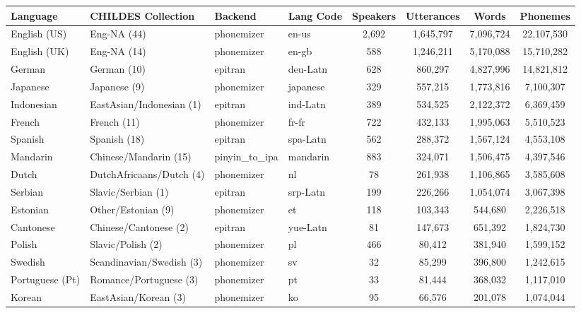 \begin{table}[t]
    \centering
    \scriptsize
    \begin{tabular}{llllcccc}
        \toprule
        \textbf{Language} & \textbf{CHILDES Collection} & \textbf{Backend} & \textbf{Lang Code} & \textbf{Speakers} & \textbf{Utterances} & \textbf{Words} & \textbf{Phonemes} \\
        \midrule
        English (US)  & Eng-NA (44) & phonemizer & en-us & 2,692  & 1,645,797  & 7,096,724  & 22,107,530 \\
        English (UK)  & Eng-NA (14) & phonemizer & en-gb & 588  & 1,246,211  & 5,170,088  & 15,710,282 \\
        German  & German (10) & epitran & deu-Latn & 628  & 860,297  & 4,827,996  & 14,821,812 \\
        Japanese  & Japanese (9) & phonemizer & japanese & 329  & 557,215  & 1,773,816  & 7,100,307 \\
        Indonesian  & EastAsian/Indonesian (1) & epitran & ind-Latn & 389  & 534,525  & 2,122,372  & 6,369,459 \\
        French  & French (11) & phonemizer & fr-fr & 722  & 432,133  & 1,995,063  & 5,510,523 \\
        Spanish  & Spanish (18) & epitran & spa-Latn & 562  & 288,372  & 1,567,124  & 4,553,108 \\
        Mandarin  & Chinese/Mandarin (15) & pinyin\_to\_ipa & mandarin & 883  & 324,071  & 1,506,475  & 4,397,546 \\
        Dutch  & DutchAfricaans/Dutch (4) & phonemizer & nl & 78  & 261,938  & 1,106,865  & 3,585,608 \\
        Serbian  & Slavic/Serbian (1) & epitran & srp-Latn & 199  & 226,266  & 1,054,074  & 3,067,398 \\
        Estonian  & Other/Estonian (9) & phonemizer & et & 118  & 103,343  & 544,680  & 2,226,518 \\
        Cantonese  & Chinese/Cantonese (2) & epitran & yue-Latn & 81  & 147,673  & 651,392  & 1,824,730 \\
        Polish  & Slavic/Polish (2) & phonemizer & pl & 466  & 80,412  & 381,940  & 1,599,152 \\
        Swedish  & Scandinavian/Swedish (3) & phonemizer & sv & 32  & 85,299  & 396,800  & 1,242,615 \\
        Portuguese (Pt)  & Romance/Portuguese (3) & phonemizer & pt & 33  & 81,444  & 368,032  & 1,117,010 \\
        Korean  & EastAsian/Korean (3) & phonemizer & ko & 95  & 66,576  & 201,078  & 1,074,044 \\

\end{tabular}
\end{table}
